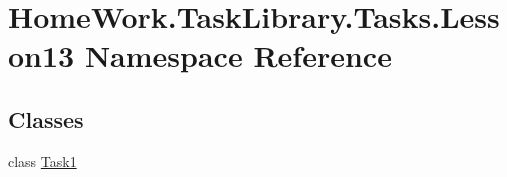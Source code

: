 \hypertarget{namespace_home_work_1_1_task_library_1_1_tasks_1_1_lesson13}{}\section{Home\+Work.\+Task\+Library.\+Tasks.\+Lesson13 Namespace Reference}
\label{namespace_home_work_1_1_task_library_1_1_tasks_1_1_lesson13}
\subsection*{Classes}
\begin{DoxyCompactItemize}
\item 
class \mbox{\hyperlink{class_home_work_1_1_task_library_1_1_tasks_1_1_lesson13_1_1_task1}{Task1}}
\end{DoxyCompactItemize}
